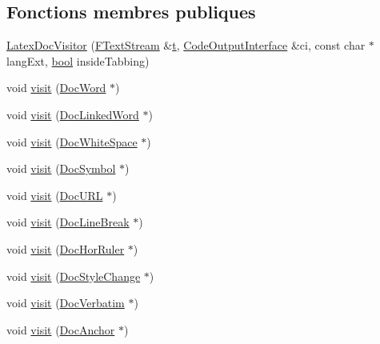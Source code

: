 \subsection*{Fonctions membres publiques}
\begin{DoxyCompactItemize}
\item 
\hyperlink{class_latex_doc_visitor_afc4b19f7484e39c08e3f9ba79006105a}{Latex\+Doc\+Visitor} (\hyperlink{class_f_text_stream}{F\+Text\+Stream} \&\hyperlink{058__bracket__recursion_8tcl_a69e959f6901827e4d8271aeaa5fba0fc}{t}, \hyperlink{class_code_output_interface}{Code\+Output\+Interface} \&ci, const char $\ast$lang\+Ext, \hyperlink{qglobal_8h_a1062901a7428fdd9c7f180f5e01ea056}{bool} inside\+Tabbing)
\item 
void \hyperlink{class_latex_doc_visitor_a8ae2ff00d6dce705978a4bda7e6109de}{visit} (\hyperlink{class_doc_word}{Doc\+Word} $\ast$)
\item 
void \hyperlink{class_latex_doc_visitor_a6d1abce8a75d42e1c5cb14cec47e3711}{visit} (\hyperlink{class_doc_linked_word}{Doc\+Linked\+Word} $\ast$)
\item 
void \hyperlink{class_latex_doc_visitor_a31c6a9d0f4f94e860238b2e44d264173}{visit} (\hyperlink{class_doc_white_space}{Doc\+White\+Space} $\ast$)
\item 
void \hyperlink{class_latex_doc_visitor_ae8806f2aa531788b324aa6a846b88b34}{visit} (\hyperlink{class_doc_symbol}{Doc\+Symbol} $\ast$)
\item 
void \hyperlink{class_latex_doc_visitor_ae326ab64b1ec7bdefc733652e6d9dda9}{visit} (\hyperlink{class_doc_u_r_l}{Doc\+U\+R\+L} $\ast$)
\item 
void \hyperlink{class_latex_doc_visitor_af4796eef0409def57b7d4ab3fee409b7}{visit} (\hyperlink{class_doc_line_break}{Doc\+Line\+Break} $\ast$)
\item 
void \hyperlink{class_latex_doc_visitor_a51aa7c77e2fb1871dc17f434ff5eaf4c}{visit} (\hyperlink{class_doc_hor_ruler}{Doc\+Hor\+Ruler} $\ast$)
\item 
void \hyperlink{class_latex_doc_visitor_aeea6aca46255fc83148f45f59b560380}{visit} (\hyperlink{class_doc_style_change}{Doc\+Style\+Change} $\ast$)
\item 
void \hyperlink{class_latex_doc_visitor_a1c5756c7d9327666b8e84f1a2959ff97}{visit} (\hyperlink{class_doc_verbatim}{Doc\+Verbatim} $\ast$)
\item 
void \hyperlink{class_latex_doc_visitor_af7b764fcd1125c6ff5a44402dfdde79b}{visit} (\hyperlink{class_doc_anchor}{Doc\+Anchor} $\ast$)
\item 

\end{DoxyCompactItemize}
